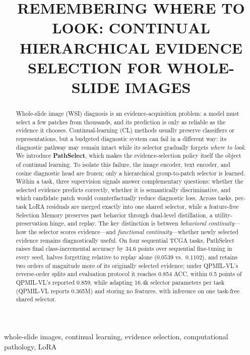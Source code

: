 \documentclass{article}
\title{REMEMBERING WHERE TO LOOK: CONTINUAL HIERARCHICAL EVIDENCE SELECTION FOR WHOLE-SLIDE IMAGES}
\begin{document}
\ninept
\maketitle

\begin{abstract}
Whole-slide image (WSI) diagnosis is an evidence-acquisition problem: a model must select a few patches from thousands, and its prediction is only as reliable as the evidence it chooses.
Continual-learning (CL) methods usually preserve classifiers or representations, but a budgeted diagnostic system can fail in a different way: its diagnostic pathway may remain intact while its selector gradually forgets \emph{where to look}.
We introduce \textbf{PathSelect}, which makes the evidence-selection policy itself the object of continual learning.
To isolate this failure, the image encoder, text encoder, and cosine diagnostic head are frozen; only a hierarchical group-to-patch selector is learned.
Within a task, three supervision signals answer complementary questions: whether the selected evidence predicts correctly, whether it is semantically discriminative, and which candidate patch would counterfactually reduce diagnostic loss.
Across tasks, per-task LoRA residuals are merged exactly into one shared selector, while a feature-free Selection Memory preserves past behavior through dual-level distillation, a utility-preservation hinge, and replay.
The key distinction is between \emph{behavioral continuity}---how the selector scores evidence---and \emph{functional continuity}---whether newly selected evidence remains diagnostically useful.
On four sequential TCGA tasks, PathSelect raises final class-incremental accuracy by 34.6 points over sequential fine-tuning in every seed, halves forgetting relative to replay alone ($0.0539$ vs.\ $0.1102$), and retains two orders of magnitude more of its originally selected evidence; under QPMIL-VL's reverse-order splits and evaluation protocol it reaches 0.854 ACC, within 0.5 points of QPMIL-VL's reported 0.859, while adapting 16.4k selector parameters per task (QPMIL-VL reports 0.365M) and storing no features, with inference on one task-free shared selector.
\end{abstract}

\begin{keywords}
whole-slide images, continual learning, evidence selection, computational pathology, LoRA
\end{keywords}
\end{document}
